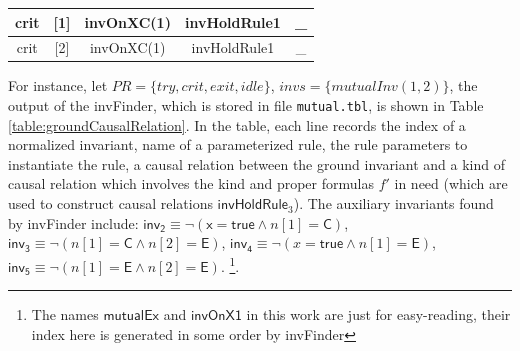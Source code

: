 \documentclass[final]{IEEEtran}
\def \eqc {=}
\def \andc {\wedge }
\def \negc {\lnot}
\begin{document}
{\begin{table}[htbp]
\begin{tabular}{|c|c|c|c|c|  }
\hline
  crit  & [1]&invOnXC(1) & invHoldRule1 &\_ \\
\hline
  crit &[2]& invOnXC(1) & invHoldRule1 &\_  \\
\hline
\end{tabular}
\end{table}


For instance, let $PR=\{try, crit, exit, idle\}$, $invs=\{mutualInv(1,2)\}$,    the output of the {\sf invFinder}, which is stored in file {\tt mutual.tbl},  is shown in Table
\ref{table:groundCausalRelation}. In the table,  each line records the    index of a normalized   invariant, name of a parameterized rule, the rule
  parameters to instantiate the rule, a causal relation between
  the ground invariant and a kind of causal relation which involves the kind and proper formulas
  $f'$   in need (which are used to construct
      causal relations $\mathsf{invHoldRule}_3$). The auxiliary invariants found by {\sf invFinder} include: $\mathsf{inv_2}  \equiv  \negc (\mathsf{x} \eqc \mathsf{true}  \andc  n[1]=\mathsf{C})$, $\mathsf{inv_3}    \equiv \negc  ( n[1]=\mathsf{C} \andc n[2]=\mathsf{E})$,
$\mathsf{inv_4}  \equiv  \negc (x \eqc \mathsf{true}  \andc  n[1]\eqc \mathsf{E})$,   $\mathsf{inv_5}    \equiv \negc  ( n[1]\eqc \mathsf{E} \andc n[2] \eqc \mathsf{E})$.  \footnote{The names $\mathsf{mutualEx}$ and $\mathsf{invOnX1}$ in
  this work are just for easy-reading, their
 index here is generated  in some order by {\sf invFinder}}.


}
\end{document}

